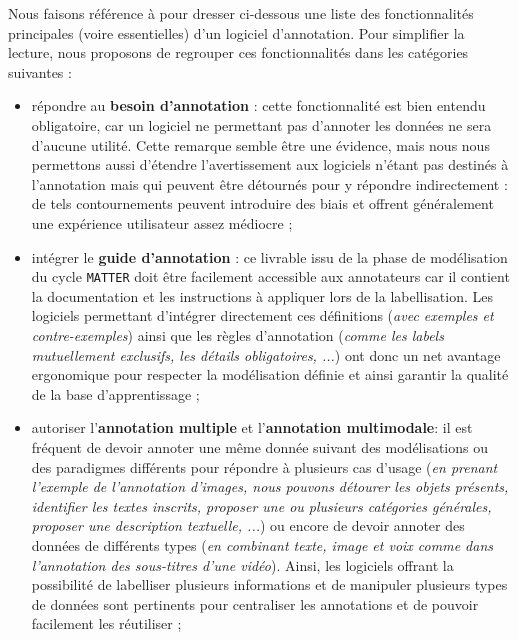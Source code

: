 		Nous faisons référence à \cite{finlayson-erjavec:2016:overview-annotation-creation} pour dresser ci-dessous une liste des fonctionnalités principales (voire essentielles) d'un logiciel d'annotation.
		Pour simplifier la lecture, nous proposons de regrouper ces fonctionnalités dans les catégories suivantes :
		\begin{itemize}
			\item répondre au \textbf{besoin d'annotation} :
				cette fonctionnalité est bien entendu obligatoire, car un logiciel ne permettant pas d'annoter les données ne sera d'aucune utilité.
				Cette remarque semble être une évidence, mais nous nous permettons aussi d'étendre l'avertissement aux logiciels n'étant pas destinés à l'annotation mais qui peuvent être détournés pour y répondre indirectement : de tels contournements peuvent introduire des biais et offrent généralement une expérience utilisateur assez médiocre ;
			\item intégrer le \textbf{guide d'annotation} :
				ce livrable issu de la phase de modélisation du cycle \texttt{MATTER} doit être facilement accessible aux annotateurs car il contient la documentation et les instructions à appliquer lors de la labellisation.
				Les logiciels permettant d'intégrer directement ces définitions (\textit{avec exemples et contre-exemples}) ainsi que les règles d'annotation (\textit{comme les labels mutuellement exclusifs, les détails obligatoires, ...}) ont donc un net avantage ergonomique pour respecter la modélisation définie et ainsi garantir la qualité de la base d'apprentissage ; 
			\item autoriser l'\textbf{annotation multiple} et l'\textbf{annotation multimodale}: 
				il est fréquent de devoir annoter une même donnée suivant des modélisations ou des paradigmes différents pour répondre à plusieurs cas d'usage (\textit{en prenant l'exemple de l'annotation d'images, nous pouvons détourer les objets présents, identifier les textes inscrits, proposer une ou plusieurs catégories générales, proposer une description textuelle, ...}) ou encore de devoir annoter des données de différents types (\textit{en combinant texte, image et voix comme dans l'annotation des sous-titres d'une vidéo}).
				Ainsi, les logiciels offrant la possibilité de labelliser plusieurs informations et de manipuler plusieurs types de données sont pertinents pour centraliser les annotations et de pouvoir facilement les réutiliser ;

\end{itemize}
